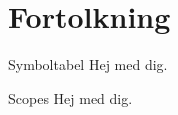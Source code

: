 \section{Fortolkning}

\begin{frame}{Symboltabel}
  Hej med dig.
  
\end{frame}

\begin{frame}{Scopes}
  Hej med dig.
  
\end{frame}

